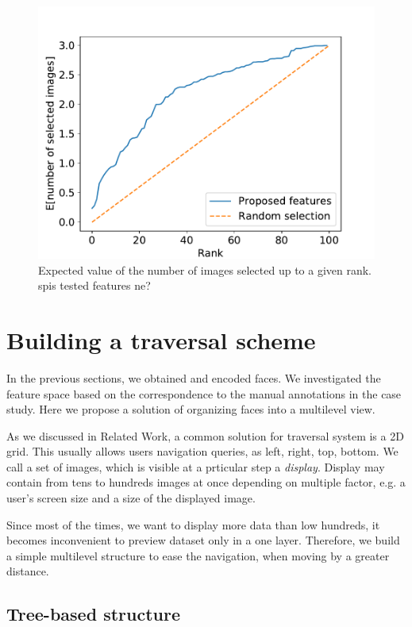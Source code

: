 \begin{figure}
    \centering
    \includegraphics[width=0.8\linewidth]{graphs/survey_cumsum_without_the_easy.pdf}
    \caption{Expected value of the number of images selected up to a given rank. {\color{red} spis tested features ne?}}
    \label{fig:my_label}
\end{figure}

\section{Building a traversal scheme}

In the previous sections, we obtained and encoded faces. We investigated the feature space based on the correspondence to the manual annotations in the case study. Here we propose a solution of organizing faces into a multilevel view. 

As we discussed in Related Work, a common solution for traversal system is a 2D grid. This usually allows users navigation queries, as left, right, top, bottom. We call a set of images, which is visible at a prticular step a \emph{display}. Display may contain from tens to hundreds images at once depending on multiple factor, e.g. a user's screen size and a size of the displayed image.

Since most of the times, we want to display more data than low hundreds, it becomes inconvenient to preview dataset only in a one layer. Therefore, we build a simple multilevel structure to ease the navigation, when moving by a greater distance.

\subsection{Tree-based structure}

